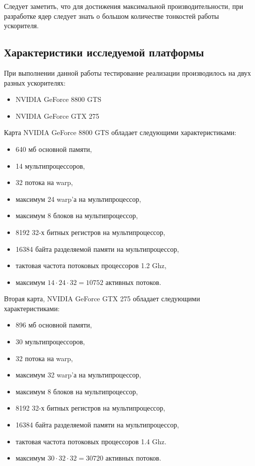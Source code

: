 Следует заметить, что для достижения максимальной производительности, при разработке ядер следует знать о большом количестве тонкостей работы ускорителя.

\subsection{Характеристики исследуемой платформы}
При выполнении данной работы тестирование реализации производилось на двух разных ускорителях:
\begin{itemize}
\item NVIDIA GeForce 8800 GTS
\item NVIDIA GeForce GTX 275
\end{itemize}

 Карта NVIDIA GeForce 8800 GTS обладает следующими характеристиками:
 \begin{itemize}
\item 640 мб основной памяти,
\item 14 мультипроцессоров,
\item 32 потока на warp,
\item максимум 24 warp'а на мультипроцессор,
\item максимум 8 блоков на мультипроцессор,
\item 8192 32-х битных регистров на мультипроцессор,
\item 16384 байта разделяемой памяти на мультипроцессор,
\item тактовая частота потоковых процессоров 1.2 Ghz,
\item максимум $14 \cdot 24\cdot 32 = 10752$ активных потоков.
 \end{itemize}

Вторая карта, NVIDIA GeForce GTX 275 обладает следующими характеристиками:
 \begin{itemize}
\item 896 мб основной памяти,
\item 30 мультипроцессоров,
\item 32 потока на warp,
\item максимум 32 warp'а на мультипроцессор,
\item максимум 8 блоков на мультипроцессор,
\item 8192 32-х битных регистров на мультипроцессор,
\item 16384 байта разделяемой памяти на мультипроцессор,
\item тактовая частота потоковых процессоров 1.4 Ghz.
\item максимум $30 \cdot 32\cdot 32 = 30720$ активных потоков.
 \end{itemize}

